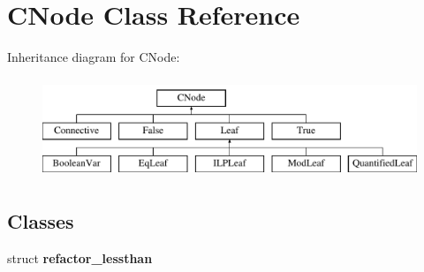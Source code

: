 \hypertarget{classCNode}{\section{\-C\-Node \-Class \-Reference}
\label{classCNode}
}
\-Inheritance diagram for \-C\-Node\-:\begin{figure}[H]
\begin{center}
\leavevmode
\includegraphics[height=3.000000cm]{classCNode}
\end{center}
\end{figure}
\subsection*{\-Classes}
\begin{DoxyCompactItemize}
\item 
struct {\bfseries refactor\-\_\-lessthan}
\end{DoxyCompactItemize}
